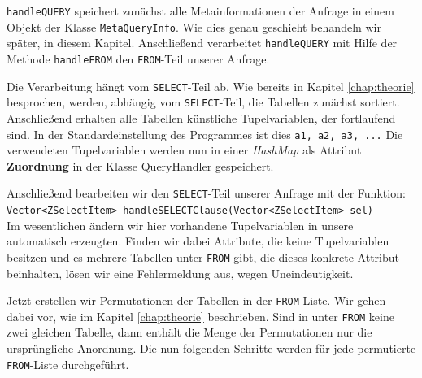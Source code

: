 \verb|handleQUERY| speichert zunächst alle Metainformationen der Anfrage in einem Objekt der Klasse \verb|MetaQueryInfo|. Wie dies genau geschieht behandeln wir später, in diesem Kapitel. Anschließend verarbeitet \verb|handleQUERY| mit Hilfe der Methode \verb|handleFROM| den \verb|FROM|-Teil unserer Anfrage. 

Die Verarbeitung hängt vom \verb|SELECT|-Teil ab. Wie bereits in Kapitel \ref{chap:theorie} besprochen, werden, abhängig vom \verb|SELECT|-Teil, die Tabellen zunächst sortiert. Anschließend erhalten alle Tabellen künstliche Tupelvariablen, der fortlaufend sind. In der Standardeinstellung des Programmes ist dies \verb|a1, a2, a3, ...| Die verwendeten Tupelvariablen werden nun in einer \textit{HashMap} als Attribut \textbf{Zuordnung} in der Klasse QueryHandler gespeichert. 

Anschließend bearbeiten wir den \verb|SELECT|-Teil unserer Anfrage mit der Funktion:\\
\verb|Vector<ZSelectItem> handleSELECTClause(Vector<ZSelectItem> sel)|\\
Im wesentlichen ändern wir hier vorhandene Tupelvariablen in unsere automatisch erzeugten. Finden wir dabei Attribute, die keine Tupelvariablen besitzen und es mehrere Tabellen unter \verb|FROM| gibt, die dieses konkrete Attribut beinhalten, lösen wir eine Fehlermeldung aus, wegen Uneindeutigkeit.

Jetzt erstellen wir Permutationen der Tabellen in der \verb|FROM|-Liste. Wir gehen dabei vor, wie im Kapitel \ref{chap:theorie} beschrieben. Sind in unter \verb|FROM| keine zwei gleichen Tabelle, dann enthält die Menge der Permutationen nur die ursprüngliche Anordnung. Die nun folgenden Schritte werden für jede permutierte \verb|FROM|-Liste durchgeführt.

